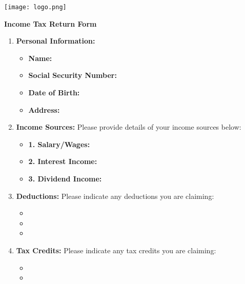 \documentclass{article}
\begin{document}
\begin{Form}
\begin{center}
\texttt{[image: logo.png]}
\end{center}

\begin{center}
\textbf{\Huge Income Tax Return Form}
\end{center}

\begin{enumerate}[label=\textbf{\arabic*.}, align=left, leftmargin=*]
    \item \textbf{Personal Information:}
    \begin{itemize}[label={}, leftmargin=*]
        \item \textbf{Name:} \TextField{}
        \item \textbf{Social Security Number:} \TextField{}
        \item \textbf{Date of Birth:} \TextField{}
        \item \textbf{Address:} \TextField{}
    \end{itemize}
    
    \item \textbf{Income Sources:}
    Please provide details of your income sources below:
    \begin{itemize}[label={}, leftmargin=*]
        \item \textbf{1. Salary/Wages:} \TextField{}
        \item \textbf{2. Interest Income:} \TextField{}
        \item \textbf{3. Dividend Income:} \TextField{}
    \end{itemize}
    
    \item \textbf{Deductions:}
    Please indicate any deductions you are claiming:
    \begin{itemize}[label={}, leftmargin=*]
        \item  {}
        \item  {}
        \item  {}
    \end{itemize}
    
    \item \textbf{Tax Credits:}
    Please indicate any tax credits you are claiming:
    \begin{itemize}[label={}, leftmargin=*]
        \item  {}
        \item  {}
    \end{itemize}
    

\end{enumerate}
\end{Form}
\end{document}
